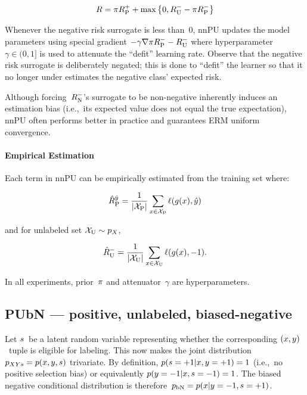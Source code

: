\begin{equation}\label{eq:Risk:nnPU}
  R = \pi R_{\textnormal{P}}^{{+}} + \max\left\{0, R_{\textnormal{U}}^{{-}} - \pi R_{\textnormal{P}}^{{-}} \right\}
\end{equation}

Whenever the negative risk surrogate is less than~0, nnPU updates the model parameters using special gradient ${-\gamma \nabla \pi R_{\textnormal{P}}^{{-}} - R_{\textnormal{U}}^{{-}}}$ where hyperparameter~${\gamma \in (0,1]}$ is used to attenuate the ``defit'' learning rate.  Observe that the negative risk surrogate is deliberately negated; this is done to ``defit'' the learner so that it no longer under estimates the negative class' expected risk.

Although forcing~$R_{\textnormal{N}}^{{-}}$'s surrogate to be non-negative inherently induces an estimation bias (i.e.,~its expected value does not equal the true expectation), nnPU often performs better in practice and guarantees ERM uniform convergence.

\paragraph{Empirical Estimation} Each term in nnPU can be empirically estimated from the training set where:

\begin{equation}\label{eq:EmpRisk:Pos}
  \hat{R}_{\textnormal{P}}^{\hat{y}} = \frac{1}{\lvert\mathcal{X}_{\textnormal{P}}\rvert} \sum_{x \in \mathcal{X}_{\textnormal{P}}} \ell\mathopen{}\left(g\mathopen{}\left(x\right)\mathclose{},\hat{y}\right)\mathclose{}
\end{equation}

\noindent
and for unlabeled set ${\mathcal{X}_{\textnormal{U}} \sim p_{X}}$,

\begin{equation}
  \hat{R}_{\textnormal{U}}^{-} = \frac{1}{\lvert\mathcal{X}_{\textnormal{U}}\rvert} \sum_{x \in \mathcal{X}_{\textnormal{U}}} \ell\mathopen{}\left(g\mathopen{}\left(x\right)\mathclose{},{-}1\right)\mathclose{} \text{.}
\end{equation}

\noindent
In all experiments, prior~$\pi$ and attenuator~$\gamma$ are hyperparameters.

\subsection{PUbN --- positive, unlabeled, biased-negative}

Let $s$~be a latent random variable representing whether the corresponding ${(x,y)}$~tuple is eligible for labeling.  This now makes the joint distribution~${p_{XYs} = p(x, y, s)}$ trivariate.  By definition, ${p(s = {+}1 \vert x, y = {+}1) = 1}$ (i.e.,~no positive selection bias) or equivalently ${p(y = {-}1 \vert x, s = {-}1) = 1}$.  The biased negative conditional distribution is therefore~${p_{\textnormal{bN}} = p(x \vert y = {-}1, s = {+}1)}$.


